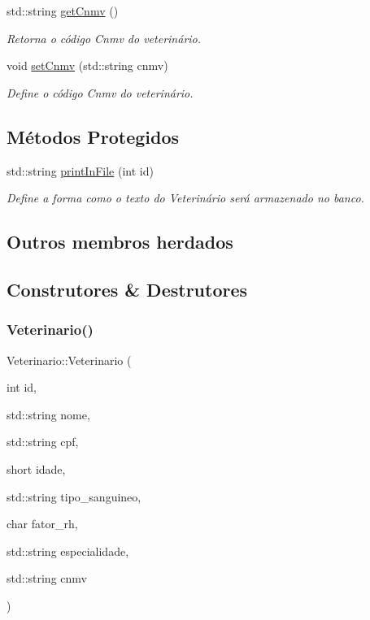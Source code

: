 \begin{DoxyCompactItemize}
std\+::string \hyperlink{classVeterinario_a48fd50544ed6af0b8c454b8f6cb812c0}{get\+Cnmv} ()
\begin{DoxyCompactList}\small\item\em Retorna o código Cnmv do veterinário. \end{DoxyCompactList}\item 
void \hyperlink{classVeterinario_a7c1e4210f1f1be4c2c45e0d16afb2e63}{set\+Cnmv} (std\+::string cnmv)
\begin{DoxyCompactList}\small\item\em Define o código Cnmv do veterinário. \end{DoxyCompactList}\end{DoxyCompactItemize}
\subsection*{Métodos Protegidos}
\begin{DoxyCompactItemize}
\item 
std\+::string \hyperlink{classVeterinario_a9c922980caf0113e0e9048ea3528e88d}{print\+In\+File} (int id)
\begin{DoxyCompactList}\small\item\em Define a forma como o texto do Veterinário será armazenado no banco. \end{DoxyCompactList}\end{DoxyCompactItemize}
\subsection*{Outros membros herdados}


\subsection{Construtores \& Destrutores}
\mbox{\label{classVeterinario_af54146873ef36b6ba8efb1258e153b3c}} 
\subsubsection{\texorpdfstring{Veterinario()}{Veterinario()}\hspace{0.1cm}{\footnotesize\ttfamily [1/2]}}
{\footnotesize\ttfamily Veterinario\+::\+Veterinario (\begin{DoxyParamCaption}\item[{int}]{id,  }\item[{std\+::string}]{nome,  }\item[{std\+::string}]{cpf,  }\item[{short}]{idade,  }\item[{std\+::string}]{tipo\+\_\+sanguineo,  }\item[{char}]{fator\+\_\+rh,  }\item[{std\+::string}]{especialidade,  }\item[{std\+::string}]{cnmv }\end{DoxyParamCaption})}



